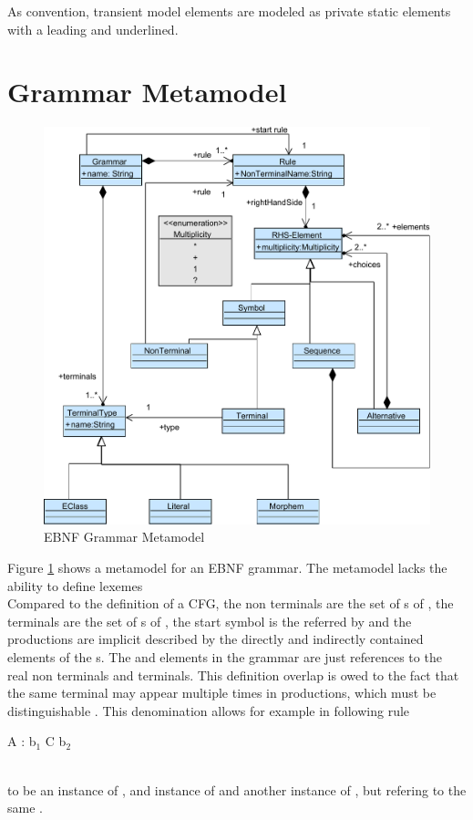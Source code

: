 As convention, transient model elements are modeled as private static elements with a leading \code{-} and underlined.

\section{Grammar Metamodel}
\begin{figure}
\centering
\includegraphics[scale=0.85]{gfx/ex/Grammar_CFG} 
\caption{EBNF Grammar Metamodel}
\label{MM:EBNF}
\end{figure}

Figure \ref{MM:EBNF} shows a metamodel for an EBNF grammar. The metamodel lacks the ability to define lexemes  \\
Compared to the definition of a CFG, the non terminals are the set of s of , the terminals are the set of s of , the start symbol is the  referred by  and the productions are implicit described by the directly and indirectly contained elements of the s. The  and  elements in the grammar are just references to the real non terminals and terminals. This definition overlap is owed to the fact that the same terminal may appear multiple times in productions, which must be distinguishable . This denomination allows for example in following rule
\\\begin{code}
A : b$_1$ C b$_2$
\end{code}\\
to be  an instance of ,  and instance of  and  another instance of , but refering to the same .

